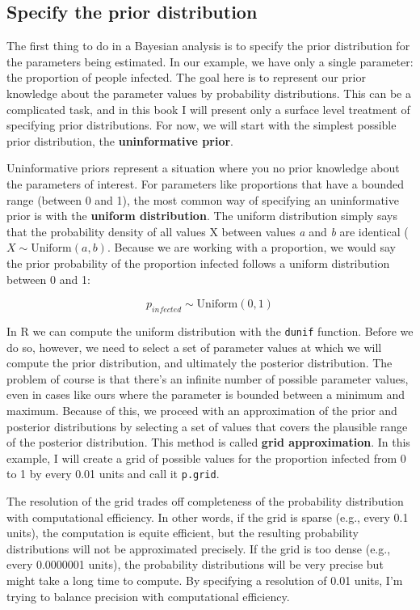 \documentclass[
]{book}
\begin{document}
\subsection{Specify the prior distribution}\label{specify-the-prior-distribution}

The first thing to do in a Bayesian analysis is to specify the prior
distribution for the parameters being estimated. In our example, we have
only a single parameter: the proportion of people infected. The goal
here is to represent our prior knowledge about the parameter values by
probability distributions. This can be a complicated task, and in this
book I will present only a surface level treatment of specifying prior
distributions. For now, we will start with the simplest possible prior
distribution, the \textbf{uninformative prior}.

Uninformative priors represent a situation where you no prior knowledge
about the parameters of interest. For parameters like proportions that
have a bounded range (between 0 and 1), the most common way of
specifying an uninformative prior is with the \textbf{uniform distribution}.
The uniform distribution simply says that the probability density of all
values X between values \emph{a} and \emph{b} are identical
(\(X\sim \text{Uniform}(a, b)\). Because we are working with a proportion,
we would say the prior probability of the proportion infected follows a
uniform distribution between 0 and 1:

\[
p_{infected}\sim \text{Uniform}(0, 1)
\]

In R we can compute the uniform distribution with the \texttt{dunif} function.
Before we do so, however, we need to select a set of parameter values at
which we will compute the prior distribution, and ultimately the
posterior distribution. The problem of course is that there's an
infinite number of possible parameter values, even in cases like ours
where the parameter is bounded between a minimum and maximum. Because of
this, we proceed with an approximation of the prior and posterior
distributions by selecting a set of values that covers the plausible
range of the posterior distribution. This method is called \textbf{grid
approximation}. In this example, I will create a grid of possible
values for the proportion infected from 0 to 1 by every 0.01 units and
call it \texttt{p.grid}.

The resolution of the grid trades off completeness of the probability
distribution with computational efficiency. In other words, if the grid
is sparse (e.g., every 0.1 units), the computation is equite efficient,
but the resulting probability distributions will not be approximated
precisely. If the grid is too dense (e.g., every 0.0000001 units), the
probability distributions will be very precise but might take a long
time to compute. By specifying a resolution of 0.01 units, I'm trying to
balance precision with computational efficiency.
\end{document}

